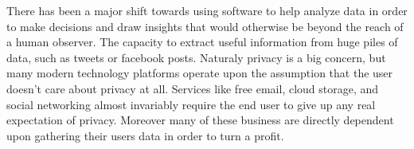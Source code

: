 There has been a major shift towards using software to help analyze data in order to make decisions and draw insights that would otherwise be beyond the reach of a human observer.\autocite[]{NextGenBusinessSoftware}
The capacity to extract useful information from huge piles of data, such as tweets or facebook posts.\autocite[]{NextGenBusinessSoftware}
Naturaly privacy is a big concern, but many modern technology platforms operate upon the assumption that the user doesn't care about privacy at all. Services like free email, cloud storage, and social networking almost invariably require the end user to give up any real expectation of privacy. Moreover many of these business are directly dependent upon gathering their users data in order to turn a profit.\autocite[]{NextGenBusinessSoftware}
